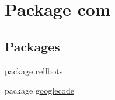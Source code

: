 \hypertarget{namespacecom}{\section{Package com}
\label{namespacecom}
}
\subsection*{Packages}
\begin{DoxyCompactItemize}
\item 
package \hyperlink{namespacecom_1_1cellbots}{cellbots}
\item 
package \hyperlink{namespacecom_1_1googlecode}{googlecode}
\end{DoxyCompactItemize}
